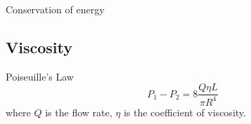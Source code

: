 \begin{derivation}
Conservation of energy

\end{derivation}

\subsection{Viscosity}


\begin{thrm}{Poiseuille's Law}{}
\begin{equation}
P_1 - P_2 = 8\frac{Q\eta L}{\pi R^4}
\end{equation}
where $Q$ is the flow rate, $\eta$ is the coefficient of viscosity.
\end{thrm}

